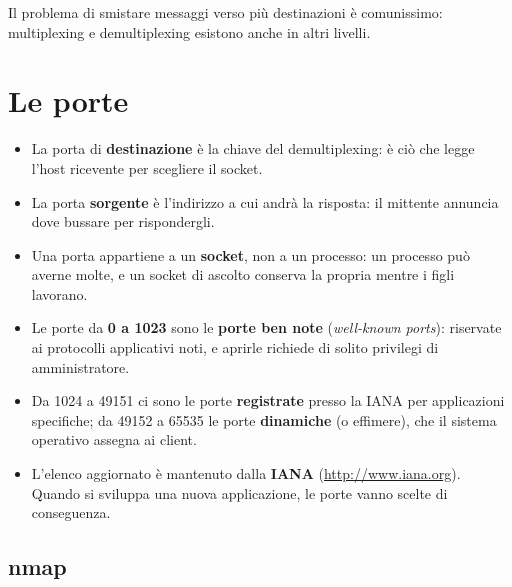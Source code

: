 Il problema di smistare messaggi verso più destinazioni è comunissimo: multiplexing e demultiplexing
esistono anche in altri livelli.

\section{Le porte}


\begin{itemize}
    \item La porta di \textbf{destinazione} è la chiave del demultiplexing: è ciò che legge l'host ricevente per scegliere
          il socket.
    \item La porta \textbf{sorgente} è l'indirizzo a cui andrà la risposta: il mittente annuncia dove bussare per
          rispondergli.
    \item Una porta appartiene a un \textbf{socket}, non a un processo: un processo può averne molte, e un socket di
          ascolto conserva la propria mentre i figli lavorano.
\end{itemize}

\begin{itemize}
    \item Le porte da \textbf{0 a 1023} sono le \textbf{porte ben note} (\emph{well-known ports}): riservate ai
          protocolli applicativi noti, e aprirle richiede di solito privilegi di amministratore.
    \item Da 1024 a 49151 ci sono le porte \textbf{registrate} presso la IANA per applicazioni specifiche; da
          49152 a 65535 le porte \textbf{dinamiche} (o effimere), che il sistema operativo assegna ai client.
    \item L'elenco aggiornato è mantenuto dalla \textbf{IANA} (\url{http://www.iana.org}). Quando si sviluppa
          una nuova applicazione, le porte vanno scelte di conseguenza.
\end{itemize}

\subsection{nmap}

